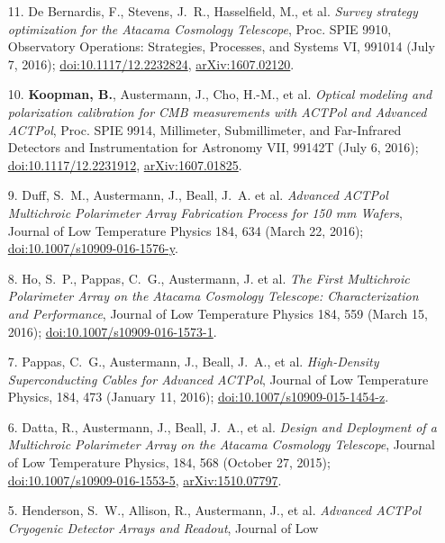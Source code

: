 \documentclass[margin,line]{res}
\begin{document}
\begin{resume}
\begin{enumerate}
\item[{11.}] De Bernardis, F., Stevens, J.~R., Hasselfield, M., et al.
    \textit{Survey strategy optimization for the Atacama Cosmology Telescope},
    Proc. SPIE 9910, Observatory Operations: Strategies, Processes, and Systems
    VI, 991014 (July 7, 2016);
    \href{http://dx.doi.org/10.1117/12.2232824}{doi:10.1117/12.2232824},
    \href{https://arxiv.org/abs/1607.02120}{arXiv:1607.02120}.
\item[{10.}] \textbf{Koopman, B.}, Austermann, J., Cho, H.-M., et al. \textit{Optical
    modeling and polarization calibration for CMB measurements with ACTPol and
    Advanced ACTPol}, Proc. SPIE 9914, Millimeter, Submillimeter, and Far-Infrared
    Detectors and Instrumentation for Astronomy VII, 99142T (July 6, 2016);
    \href{http://dx.doi.org/10.1117/12.2231912}{doi:10.1117/12.2231912},
    \href{https://arxiv.org/abs/1607.01825}{arXiv:1607.01825}.
\item[{9.}] Duff, S.~M., Austermann, J., Beall, J.~A. et al. \textit{Advanced
    ACTPol Multichroic Polarimeter Array Fabrication Process for 150 mm Wafers},
    Journal of Low Temperature Physics 184, 634 (March 22, 2016);
    \href{http://dx.doi.org/10.1007/s10909-016-1576-y}{doi:10.1007/s10909-016-1576-y}.
\item[{8.}] Ho, S.~P., Pappas, C.~G., Austermann, J. et al. \textit{The First
    Multichroic Polarimeter Array on the Atacama Cosmology Telescope:
    Characterization and Performance}, Journal of Low Temperature Physics 184, 559 (March 15, 2016);
    \href{http://dx.doi.org/10.1007/s10909-016-1573-1}{doi:10.1007/s10909-016-1573-1}.
\item[{7.}] Pappas, C.~G., Austermann, J., Beall, J.~A., et al.
    \textit{High-Density Superconducting Cables for Advanced ACTPol}, Journal of Low
    Temperature Physics, 184, 473 (January 11, 2016);
    \href{http://dx.doi.org/10.1007/s10909-015-1454-z}{doi:10.1007/s10909-015-1454-z}.
\item[{6.}] Datta, R., Austermann, J., Beall, J.~A., et al. \textit{Design and
    Deployment of a Multichroic Polarimeter Array on the Atacama Cosmology
    Telescope}, Journal of Low Temperature Physics, 184, 568 (October 27, 2015);
    \href{http://dx.doi.org/10.1007/s10909-016-1553-5}{doi:10.1007/s10909-016-1553-5},
    \href{http://arxiv.org/abs/1510.07797}{arXiv:1510.07797}.
\item[{5.}] Henderson, S.~W., Allison, R., Austermann, J., et al.
    \textit{Advanced ACTPol Cryogenic Detector Arrays and Readout}, Journal of Low

\end{enumerate}
\end{resume}
\end{document}
